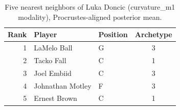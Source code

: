 \begin{table}[htbp]
  \centering\small
  \begin{tabular}{rllc}
    \toprule
    Rank & Player & Position & Archetype \\
    \midrule
    1 & LaMelo Ball & G & 3 \\
    2 & Tacko Fall & C & 1 \\
    3 & Joel Embiid & C & 3 \\
    4 & Johnathan Motley & F & 3 \\
    5 & Ernest Brown & C & 1 \\
    \bottomrule
  \end{tabular}
  \caption{Five nearest neighbors of Luka Doncic (curvature_m1 modality), Procrustes-aligned posterior mean.}
  \label{tab:Luka_Doncic_neighbors_curvature_m1}
\end{table}

